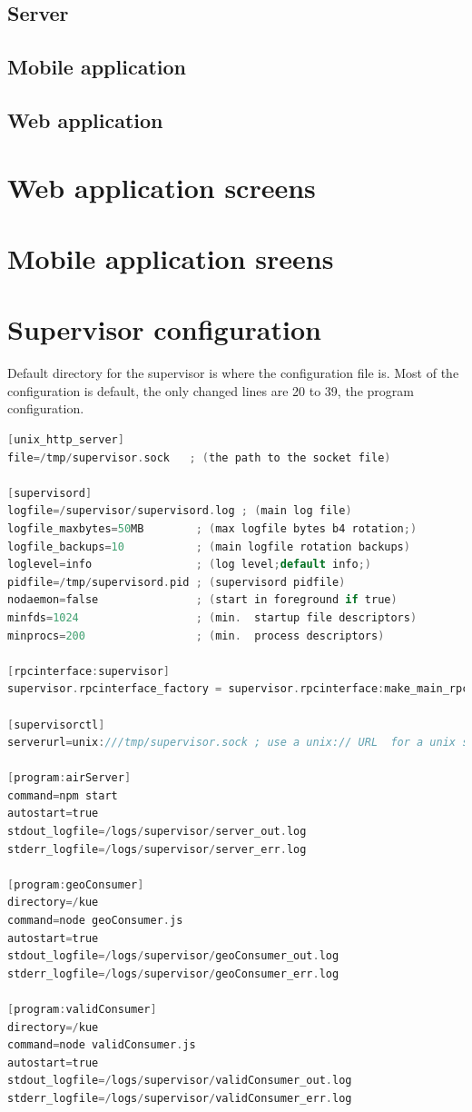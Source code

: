 \documentclass[thesis=M,english]{FITthesis}[2012/10/20]
\begin{document}
\section{Server}
\section{Mobile application}
\section{Web application}

\chapter{Web application screens}

\chapter{Mobile application sreens}

\chapter{Supervisor configuration}
\label{apx:supervisor}

Default directory for the supervisor is where the configuration file is. Most of the configuration is default, the only changed lines are 20 to 39, the program configuration.
\begin{lstlisting}[language=C]
[unix_http_server]
file=/tmp/supervisor.sock   ; (the path to the socket file)

[supervisord]
logfile=/supervisor/supervisord.log ; (main log file)
logfile_maxbytes=50MB        ; (max logfile bytes b4 rotation;)
logfile_backups=10           ; (main logfile rotation backups)
loglevel=info                ; (log level;default info;)
pidfile=/tmp/supervisord.pid ; (supervisord pidfile)
nodaemon=false               ; (start in foreground if true)
minfds=1024                  ; (min.  startup file descriptors)
minprocs=200                 ; (min.  process descriptors)

[rpcinterface:supervisor]
supervisor.rpcinterface_factory = supervisor.rpcinterface:make_main_rpcinterface

[supervisorctl]
serverurl=unix:///tmp/supervisor.sock ; use a unix:// URL  for a unix socket

[program:airServer]
command=npm start
autostart=true 
stdout_logfile=/logs/supervisor/server_out.log
stderr_logfile=/logs/supervisor/server_err.log  

[program:geoConsumer]
directory=/kue
command=node geoConsumer.js
autostart=true 
stdout_logfile=/logs/supervisor/geoConsumer_out.log
stderr_logfile=/logs/supervisor/geoConsumer_err.log  

[program:validConsumer]
directory=/kue
command=node validConsumer.js
autostart=true 
stdout_logfile=/logs/supervisor/validConsumer_out.log
stderr_logfile=/logs/supervisor/validConsumer_err.log  

\end{lstlisting}
\end{document}
